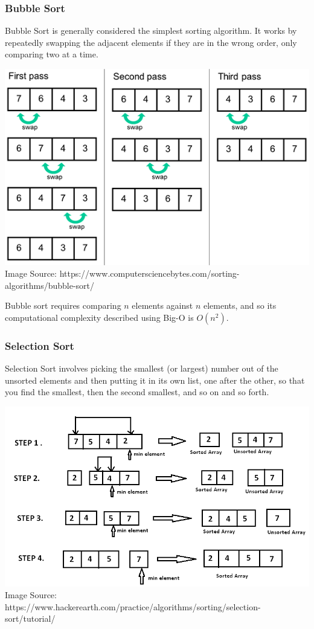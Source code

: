 \subsubsection{Bubble Sort}

Bubble Sort is generally considered the simplest sorting algorithm. It works by repeatedly swapping the adjacent elements if they are in the wrong order, only comparing two at a time.

\includegraphics[width=\textwidth]{images/bubble_sort.png}
Image Source: https://www.computersciencebytes.com/sorting-algorithms/bubble-sort/

Bubble sort requires comparing $n$ elements against $n$ elements, and so its computational complexity described using Big-O is $O(n^2)$.

\subsubsection{Selection Sort}

Selection Sort involves picking the smallest (or largest) number out of the unsorted elements and then putting it in its own list, one after the other, so that you find the smallest, then the second smallest, and so on and so forth. 

\includegraphics[width=\textwidth]{images/selection-sort.png}
Image Source: https://www.hackerearth.com/practice/algorithms/sorting/selection-sort/tutorial/

